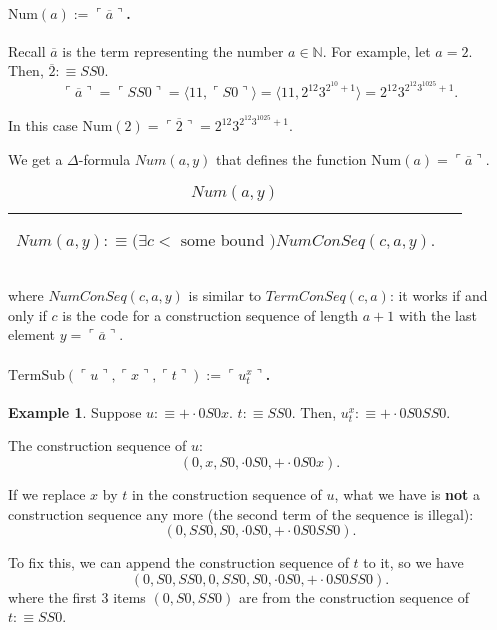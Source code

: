 \documentclass[11pt,letterpaper]{book}
\theoremstyle{definition}
\newtheorem{example}{Example}[section]
\begin{document}
\paragraph{$\text{Num}(a) := \ulcorner \overline{a} \urcorner$.}

Recall $\overline{a}$ is the term representing the number $a \in \mathbb{N}$. For example, let $a=2$. Then, $\overline{2} :\equiv S S 0$.
$$ \ulcorner \overline{a} \urcorner = \ulcorner S S 0 \urcorner = \langle 11, \ulcorner S 0  \urcorner \rangle  = \langle 11, 2^{12} 3^{2^{10}+1} \rangle = 2^{12} 3^{2^{12} 3^{1025} + 1} .$$

In this case $\text{Num}(2) = \ulcorner \overline{2} \urcorner = 2^{12} 3^{2^{12} 3^{1025} + 1}  $.

We get a $\Delta$-formula $Num(a, y)$ that defines the function $\text{Num} (a) = \ulcorner \overline{a} \urcorner$.


\begin{table}[h]
\caption{$Num(a, y)$}
\label{box:num_func}
\begin{tabular}{|p{0.9\linewidth}|}
\hline
\rule{0pt}{3ex}
\begin{center}
$Num(a, y) : \equiv \big(\exists c < \text{ some bound }  \big) NumConSeq(c, a, y). $
\end{center}\\
\hline
\end{tabular}
\end{table}
where $NumConSeq(c, a, y)$ is similar to $TermConSeq(c, a)$: it works if and only if $c$ is the code for a construction sequence of length $a+1$ with the last element $y = \ulcorner \overline{a} \urcorner$.


\paragraph{$\text{TermSub}( \ulcorner u \urcorner,  \ulcorner x \urcorner,  \ulcorner t \urcorner ) :=  \ulcorner u_t ^x \urcorner $.}

\begin{example}
Suppose $u :\equiv + \cdot 0 S 0 x$. $t :\equiv S S0$. Then, $u_t ^x :\equiv + \cdot 0 S 0 S S 0$.

The construction sequence of $u$:
$$ (0, x, S 0, \cdot 0 S 0, + \cdot 0 S 0 x ) . $$

If we replace $x$ by $t$ in the construction sequence of $u$, what we have is \textbf{not} a construction sequence any more (the second term of the sequence is illegal):
$$(0, SS0, S 0, \cdot 0 S 0, + \cdot 0 S 0 S S 0 ) . $$

To fix this, we can append the construction sequence of $t$ to it, so we have
$$( 0, S0, SS0, 0, SS0, S 0, \cdot 0 S 0, + \cdot 0 S 0 S S 0 ) . $$
where the first 3 items $(0, S0, SS0)$ are from the construction sequence of $t:\equiv SS0$.

\end{example}
\end{document}
